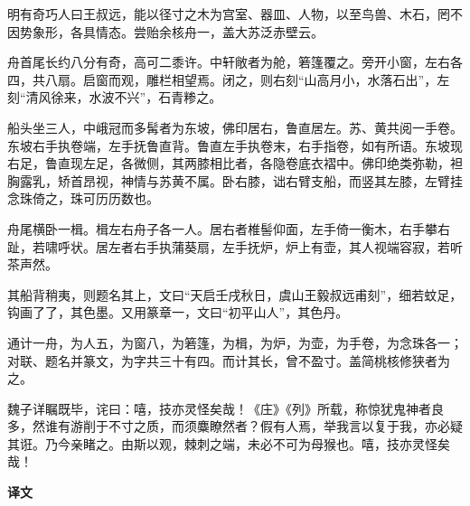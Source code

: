 \documentclass[12pt,UTF-8,openany,a4]{ctexbook}
\begin{document}
\begin{large}
    
    明有奇巧人曰王叔远，能以径寸之木为宫室、器皿、人物，以至鸟兽、木石，罔不因势象形，各具情态。尝贻余核舟一，盖大苏泛赤壁云。
    
    舟首尾长约八分有奇，高可二黍许。中轩敞者为舱，箬篷覆之。旁开小窗，左右各四，共八扇。启窗而观，雕栏相望焉。闭之，则右刻“山高月小，水落石出”，左刻“清风徐来，水波不兴”，石青糁之。
    
    船头坐三人，中峨冠而多髯者为东坡，佛印居右，鲁直居左。苏、黄共阅一手卷。东坡右手执卷端，左手抚鲁直背。鲁直左手执卷末，右手指卷，如有所语。东坡现右足，鲁直现左足，各微侧，其两膝相比者，各隐卷底衣褶中。佛印绝类弥勒，袒胸露乳，矫首昂视，神情与苏黄不属。卧右膝，诎右臂支船，而竖其左膝，左臂挂念珠倚之，珠可历历数也。
    
    舟尾横卧一楫。楫左右舟子各一人。居右者椎髻仰面，左手倚一衡木，右手攀右趾，若啸呼状。居左者右手执蒲葵扇，左手抚炉，炉上有壶，其人视端容寂，若听茶声然。
    
    其船背稍夷，则题名其上，文曰“天启壬戌秋日，虞山王毅叔远甫刻”，细若蚊足，钩画了了，其色墨。又用篆章一，文曰“初平山人”，其色丹。
    
    通计一舟，为人五，为窗八，为箬篷，为楫，为炉，为壶，为手卷，为念珠各一；对联、题名并篆文，为字共三十有四。而计其长，曾不盈寸。盖简桃核修狭者为之。
    
    魏子详瞩既毕，诧曰：嘻，技亦灵怪矣哉！《庄》《列》所载，称惊犹鬼神者良多，然谁有游削于不寸之质，而须麋瞭然者？假有人焉，举我言以复于我，亦必疑其诳。乃今亲睹之。由斯以观，棘刺之端，未必不可为母猴也。嘻，技亦灵怪矣哉！
\end{large}


\newpage

\begin{Large}
    \noindent\textbf{译文}
\end{Large}


\vspace{1em}
\end{document}
